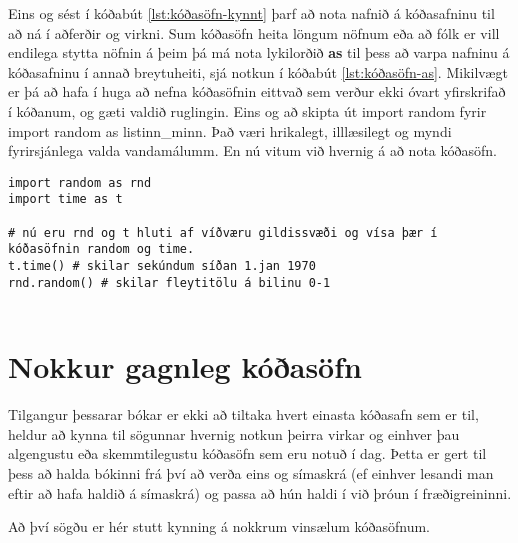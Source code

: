 Eins og sést í kóðabút \ref{lst:kóðasöfn-kynnt} þarf að nota nafnið á kóðasafninu til að ná í aðferðir og virkni.
Sum kóðasöfn heita löngum nöfnum eða að fólk er vill endilega stytta nöfnin á þeim þá má nota lykilorðið \textbf{as} til þess að varpa nafninu á kóðasafninu í annað breytuheiti, sjá notkun í kóðabút \ref{lst:kóðasöfn-as}.
Mikilvægt er þá að hafa í huga að nefna kóðasöfnin eittvað sem verður ekki óvart yfirskrifað í kóðanum, og gæti valdið ruglingin.
Eins og að skipta út import random fyrir import random as listinn\_minn.
Það væri hrikalegt, illlæsilegt og myndi fyrirsjánlega valda vandamálumm.
En nú vitum við hvernig á að nota kóðasöfn.

\begin{lstlisting}[caption=Lykilorði as, label=lst:kóðasöfn-as]
import random as rnd
import time as t

# nú eru rnd og t hluti af víðværu gildissvæði og vísa þær í kóðasöfnin random og time.
t.time() # skilar sekúndum síðan 1.jan 1970
rnd.random() # skilar fleytitölu á bilinu 0-1
	
\end{lstlisting}

\section{Nokkur gagnleg kóðasöfn}\label{uk:kóðasöfn-gagnleg}
Tilgangur þessarar bókar er ekki að tiltaka hvert einasta kóðasafn sem er til, heldur að kynna til sögunnar hvernig notkun þeirra virkar og einhver þau algengustu eða skemmtilegustu kóðasöfn sem eru notuð í dag.
Þetta er gert til þess að halda bókinni frá því að verða eins og símaskrá (ef einhver lesandi man eftir að hafa haldið á símaskrá) og passa að hún haldi í við þróun í fræðigreininni.

Að því sögðu er hér stutt kynning á nokkrum vinsælum kóðasöfnum.

